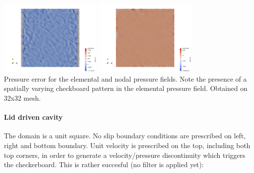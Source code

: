 \begin{center}
\includegraphics[width=5cm]{python_codes/fieldstone_12/results/rand/errq7}
\includegraphics[width=5cm]{python_codes/fieldstone_12/results/rand/errq8}\\
{\captionfont Pressure error for the elemental and nodal pressure fields. Note 
the presence of a spatially varying checkboard pattern in the elemental pressure field.
Obtained on 32x32 mesh.}
\end{center}


\newpage
\paragraph{Lid driven cavity}

The domain is a unit square. No slip boundary conditions are prescribed 
on left, right and bottom boundary. Unit velocity is prescribed on the top, 
including both top corners, in order to generate a velocity/pressure discontinuity  
which triggers the checkerboard. This is rather succesful (no filter is applied yet):


